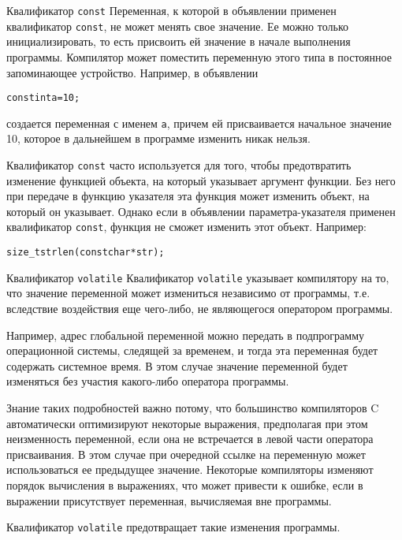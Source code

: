 \documentclass[xcolor=table]{beamer}
\begin{document}
\begin{frame}{Квалификатор \texttt{const}}
    Переменная, к которой в объявлении применен квалификатор \texttt{const}, не может менять свое значение. Ее можно только инициализировать, то есть присвоить ей значение в начале выполнения программы. Компилятор может поместить переменную этого типа в постоянное запоминающее устройство. Например, в объявлении 
    \begin{alltt}
        const int a = 10;
    \end{alltt}
    создается переменная с именем \texttt{a}, причем ей присваивается начальное значение 10, которое в дальнейшем в программе изменить никак нельзя. 
    
    Квалификатор \texttt{const}  часто используется для того, чтобы предотвратить изменение функцией объекта, на который указывает аргумент функции. Без него при передаче в функцию указателя эта функция может изменить объект, на который он указывает. Однако если в объявлении параметра-указателя применен квалификатор \texttt{const}, функция не сможет изменить этот объект. Например:
    \begin{alltt}
        size\_t strlen(const char *str);
    \end{alltt}
\end{frame}

\begin{frame}{Квалификатор \texttt{volatile}}
    Квалификатор \texttt{volatile} указывает компилятору на то, что значение переменной может измениться независимо от программы, т.е. вследствие воздействия еще чего-либо, не являющегося оператором программы.
    
    Например, адрес глобальной переменной можно передать в подпрограмму операционной системы, следящей за временем, и тогда эта переменная будет содержать системное время. В этом случае значение переменной будет изменяться без участия какого-либо оператора программы.
    
    Знание таких подробностей важно потому, что большинство компиляторов C автоматически оптимизируют некоторые выражения, предполагая при этом неизменность переменной, если она не встречается в левой части оператора присваивания. В этом случае при очередной ссылке на переменную может использоваться ее предыдущее значение. Некоторые компиляторы изменяют порядок вычисления в выражениях, что может привести к ошибке, если в выражении присутствует переменная, вычисляемая вне программы.
    
    Квалификатор \texttt{volatile} предотвращает такие изменения программы.
\end{frame}
\end{document}
